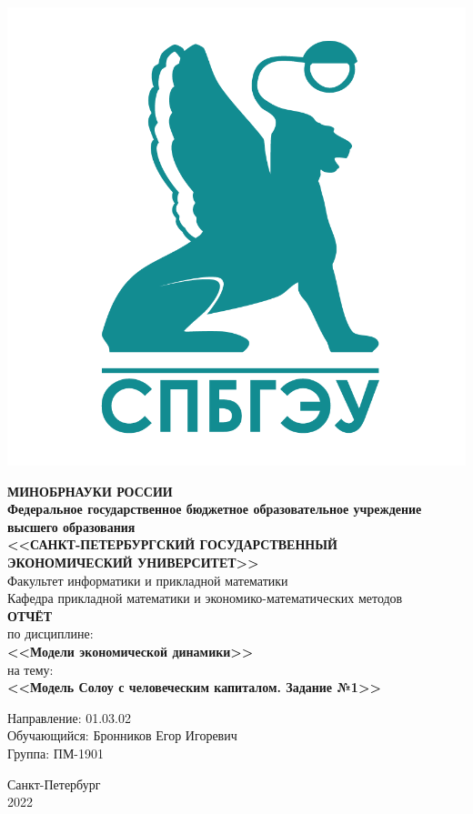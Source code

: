 \documentclass[14pt,fleqn]{extarticle}
\begin{document}
	\begin{titlepage}
		\includegraphics[scale=0.12]{logo}
		\begin{center}
			\textbf{МИНОБРНАУКИ РОССИИ}\\
			\vspace{0.2cm}
			\textbf{Федеральное государственное бюджетное образовательное учреждение высшего образования}\\
			\textbf{<<САНКТ-ПЕТЕРБУРГСКИЙ ГОСУДАРСТВЕННЫЙ ЭКОНОМИЧЕСКИЙ УНИВЕРСИТЕТ>>}\\
			\vspace{0.6cm}
			Факультет информатики и прикладной математики\\
			Кафедра прикладной математики и экономико-математических методов\\
			\vspace{1cm}
			\textbf{ОТЧЁТ}\\
			по дисциплине:\\
			\textbf{<<Модели экономической динамики>>}\\
			на тему:\\
			\textbf{<<Модель Солоу с человеческим капиталом. Задание №1>>}\\
		\end{center}
		\vspace{1cm}
		Направление: 01.03.02\\
		Обучающийся: Бронников Егор Игоревич\\
		Группа: ПМ-1901\\
		\vfill
		\begin{center}
			Санкт-Петербург\\
			2022\\
		\end{center}
	\end{titlepage}
\end{document}
